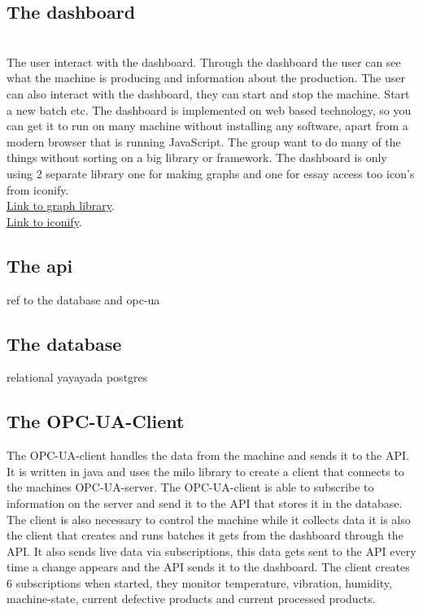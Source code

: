 \subsection{The dashboard}%
 \\
The user interact with the dashboard. Through the dashboard the user can see
what the machine is producing and information about the production. The user can
also interact with the dashboard, they can start and stop the machine. Start a
new batch etc.
The dashboard is implemented on web based 
technology, so you can get it to run on many machine without installing any 
software, apart from a modern browser that is running JavaScript.
The group want to do many of the things without sorting on a big library or 
framework. The dashboard is only using 2 separate library one for making graphs
and one for essay access too icon's from iconify. 
\\
\href{https://www.chartjs.org/}{Link to graph library}.
\\
\href{https://iconify.design/}{Link to iconify}.


\subsection{The api}
\label{sub:the_api}
ref to the database and opc-ua

\subsection{The database}
relational yayayada postgres


\subsection{The OPC-UA-Client}
The OPC-UA-client handles the data from the machine and sends it to the API. It 
is written in java and uses the milo library to create a client that connects to 
the machines OPC-UA-server. The OPC-UA-client is able to subscribe to 
information on the server and send it to the API that stores it in the database. 
The client is also necessary to control the machine while it collects data it is 
also the client that creates and runs batches it gets from the dashboard through 
the API. It also sends live data via subscriptions, this data gets sent to the 
API every time a change appears and the API sends it to the dashboard. The 
client creates 6 subscriptions when started, they monitor temperature, 
vibration, humidity, machine-state,  current defective products and current 
processed products. 

